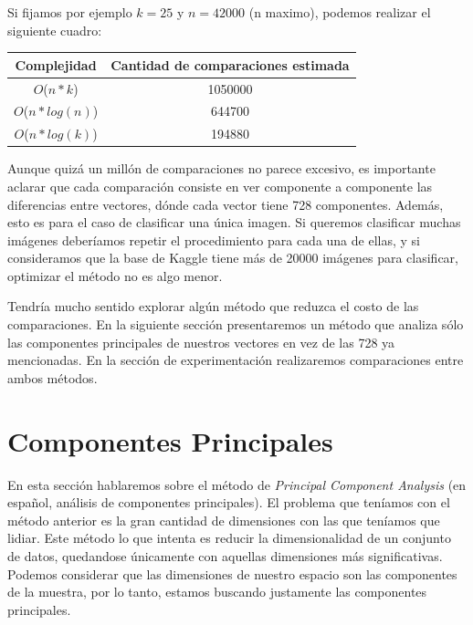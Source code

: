 Si fijamos por ejemplo $k = 25$ y $n = 42000$ (n maximo), podemos realizar el siguiente cuadro:

\begin{center}
    \begin{tabular}{| c | c |}
    \hline
    Complejidad   &  Cantidad de comparaciones estimada \\ \hline

    $O$($n * k$)            & 1050000  \\ \hline
    $O$($n * log(n)$)       & 644700  \\ \hline
    $O$($n * log(k)$)       & 194880   \\ \hline
    \end{tabular}
\end{center}

Aunque quizá un millón de comparaciones no parece excesivo, es importante aclarar que cada comparación consiste en ver componente a componente las diferencias entre vectores, dónde cada vector tiene 728 componentes. Además, esto es para el caso de clasificar una única imagen. Si queremos clasificar muchas imágenes deberíamos repetir el procedimiento para cada una de ellas, y si consideramos que la base de Kaggle tiene más de 20000 imágenes para clasificar, optimizar el método no es algo menor. \\



Tendría mucho sentido explorar algún método que reduzca el costo de las comparaciones. En la siguiente sección presentaremos un método que analiza sólo las componentes principales de nuestros vectores en vez de las 728 ya mencionadas. En la sección de experimentación realizaremos comparaciones entre ambos métodos. \\


\section{Componentes Principales}

En esta sección hablaremos sobre el método de \textit{Principal Component Analysis} (en español, análisis de componentes principales). El problema que teníamos con el método anterior es la gran cantidad de dimensiones con las que teníamos que lidiar. Este método lo que intenta es reducir la dimensionalidad de un conjunto de datos, quedandose únicamente con aquellas dimensiones más significativas. Podemos considerar que las dimensiones de nuestro espacio son las componentes de la muestra, por lo tanto, estamos buscando justamente las componentes principales. \\

